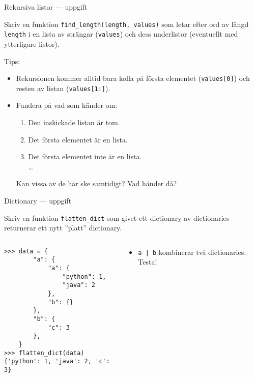 \documentclass{beamer}
\begin{document}

  \begin{frame}[fragile]{Rekursiva listor --- uppgift}

    Skriv en funktion \texttt{find\_length(length, values)} som letar efter ord
      av längd \texttt{length} i en lista av strängar (\texttt{values}) och dess
      underlistor (eventuellt med ytterligare listor).

    Tips:

    \vspace{-1em}

    \begin{itemize}

      \item Rekursionen kommer alltid bara kolla på första elementet
      (\texttt{values[0]}) och resten av listan (\texttt{values[1:]}).

      \item Fundera på vad som händer om:

      \begin{enumerate}
        \item Den inskickade listan är tom.
        \item Det första elementet är en lista.
        \item Det första elementet inte är en lista. \\
        \dots{}
      \end{enumerate}

      Kan vissa av de här ske samtidigt? Vad händer då?

    \end{itemize}

  \end{frame}

  \begin{frame}[fragile]{Dictionary --- uppgift}

    Skriv en funktion \texttt{flatten\_dict} som givet ett dictionary av
    dictionaries returnerar ett nytt ''platt'' dictionary.

    \begin{columns}
      \begin{column}{0.48\textwidth}
        \begin{verbatim}
>>> data = {
        "a": {
            "a": {
                "python": 1,
                "java": 2
            },
            "b": {}
        },
        "b": {
            "c": 3
        },
    }
>>> flatten_dict(data)
{'python': 1, 'java': 2, 'c': 3}
        \end{verbatim}
      \end{column}
      \begin{column}{0.48\textwidth}

        \begin{itemize}
          \item \texttt{a | b} kombinerar två dictionaries. Testa!
        \end{itemize}

      \end{column}
    \end{columns}

  \end{frame}
\end{document}
